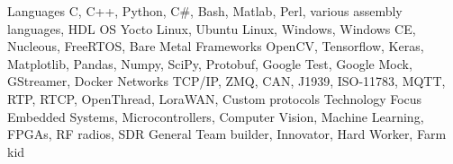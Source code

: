 

\begin{cvskills}

  \cvskill
    {Languages} %
    {C, C++, Python, C\#, Bash, Matlab, Perl, various assembly languages, HDL} %
  \cvskill
    {OS} %
    {Yocto Linux, Ubuntu Linux, Windows, Windows CE, Nucleous, FreeRTOS, Bare Metal} %
  \cvskill
    {Frameworks} %
    {OpenCV, Tensorflow, Keras, Matplotlib, Pandas, Numpy, SciPy, Protobuf, Google Test, Google Mock, GStreamer, Docker} %
  \cvskill
    {Networks} %
    {TCP/IP, ZMQ, CAN, J1939, ISO-11783, MQTT, RTP, RTCP, OpenThread, LoraWAN, Custom protocols} %
  \cvskill
    {Technology Focus} %
    {Embedded Systems, Microcontrollers, Computer Vision, Machine Learning, FPGAs, RF radios, SDR} %
    \cvskill
    {General} %
    {Team builder, Innovator, Hard Worker, Farm kid} %

\end{cvskills}
